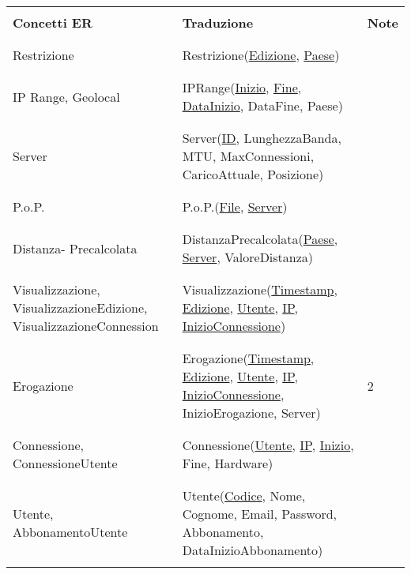 \documentclass{article}
\begin{document}
%
%
%
%
%
%
%
%
\begin{tabular}{|C{2.7cm}|C{8cm}|C{0.8cm}|}
\hline
& & \\
    \textbf{Concetti ER} & \textbf{Traduzione} & \textbf{Note} \\
& & \\
\hline 
& & \\
    
    Restrizione & Restrizione(\underline{Edizione}, \underline{Paese}) & \\
& & \\
\hline
& & \\
    IP Range, Geolocal & IPRange(\underline{Inizio}, \underline{Fine}, \underline{DataInizio}, DataFine, Paese) & \\ 
& & \\ 
\hline
& & \\
    Server & Server(\underline{ID}, LunghezzaBanda, MTU, MaxConnessioni, CaricoAttuale, Posizione) & \\
& & \\
\hline
& & \\
    P.o.P. & P.o.P.(\underline{File}, \underline{Server}) & \\ 
& & \\ 
\hline
& & \\
    Distanza- Precalcolata & DistanzaPrecalcolata(\underline{Paese}, \underline{Server}, ValoreDistanza) & \\ 
& & \\ 
\hline
& & \\
    Visualizzazione, VisualizzazioneEdizione, VisualizzazioneConnession & Visualizzazione(\underline{Timestamp}, \underline{Edizione}, \underline{Utente}, \underline{IP}, \underline{InizioConnessione}) & \\
& & \\
\hline
& & \\
    Erogazione & Erogazione(\underline{Timestamp}, \underline{Edizione}, \underline{Utente}, \underline{IP}, \underline{InizioConnessione}, InizioErogazione, Server) & 2 \\
& & \\
\hline
& & \\
    Connessione, ConnessioneUtente & Connessione(\underline{Utente}, \underline{IP}, \underline{Inizio}, Fine, Hardware) & \\
& & \\
\hline
& & \\
    Utente, AbbonamentoUtente & Utente(\underline{Codice}, Nome, Cognome, Email, Password, Abbonamento, DataInizioAbbonamento) & \\
& & \\
\hline
\end{tabular} \\ \\
\end{document}
